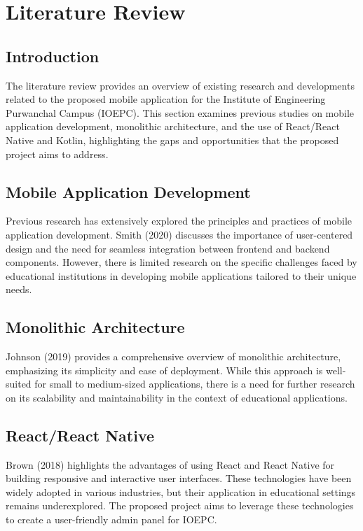 \chapter{Literature Review}

\section{Introduction}
The literature review provides an overview of existing research and developments related to the proposed mobile application for the Institute of Engineering Purwanchal Campus (IOEPC). This section examines previous studies on mobile application development, monolithic architecture, and the use of React/React Native and Kotlin, highlighting the gaps and opportunities that the proposed project aims to address.

\section{Mobile Application Development}
Previous research has extensively explored the principles and practices of mobile application development. Smith (2020) discusses the importance of user-centered design and the need for seamless integration between frontend and backend components. However, there is limited research on the specific challenges faced by educational institutions in developing mobile applications tailored to their unique needs.

\section{Monolithic Architecture}
Johnson (2019) provides a comprehensive overview of monolithic architecture, emphasizing its simplicity and ease of deployment. While this approach is well-suited for small to medium-sized applications, there is a need for further research on its scalability and maintainability in the context of educational applications.

\section{React/React Native}
Brown (2018) highlights the advantages of using React and React Native for building responsive and interactive user interfaces. These technologies have been widely adopted in various industries, but their application in educational settings remains underexplored. The proposed project aims to leverage these technologies to create a user-friendly admin panel for IOEPC.

